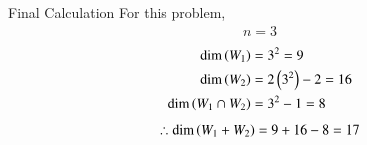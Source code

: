 \documentclass{beamer}
\begin{document}
\begin{frame}{Final Calculation}
For this problem,
\begin{align}
    n=3
\end{align}
\begin{align}
    \dim\left(W_1\right) &= 3^2 = 9 \\
    \dim\left(W_2\right) &= 2\left(3^2\right) - 2 = 16 \\
    \dim\left(W_1 \cap W_2\right) &= 3^2 - 1 = 8
\end{align}
\begin{align}
    \therefore \dim\left(W_1 + W_2\right) = 9 + 16 - 8 = 17
\end{align}
\end{frame}
\end{document}
